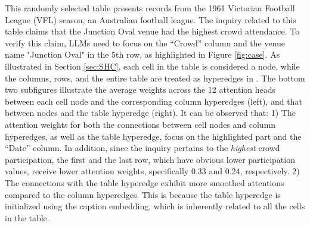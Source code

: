 This randomly selected table presents records from the 1961 Victorian Football League (VFL) season, an Australian football league. The inquiry related to this table claims that the Junction Oval venue had the highest crowd attendance. To verify this claim, LLMs need to focus on the ``Crowd'' column and the venue name "Junction Oval" in the 5th row, as highlighted in Figure \ref{fig:case}. As illustrated in Section \ref{sec:SHC}, each cell in the table is considered a node, while the columns, rows, and the entire table are treated as hyperedges in \name. The bottom two subfigures illustrate the average weights across the 12 attention heads between each cell node and the corresponding column hyperedges (left), and that between nodes and the table hyperedge (right). It can be observed that: 1) The attention weights for both the connections between cell nodes and column hyperedges, as well as the table hyperedge, focus on the highlighted part and the ``Date'' column. In addition, since the inquiry pertains to the \textit{highest} crowd participation, the first and the last row, which have obvious lower participation values, receive lower attention weights, specifically 0.33 and 0.24, respectively. 2) The connections with the table hyperedge exhibit more smoothed attentions compared to the column hyperedges. This is because the table hyperedge is initialized using the caption embedding, which is inherently related to all the cells in the table. 